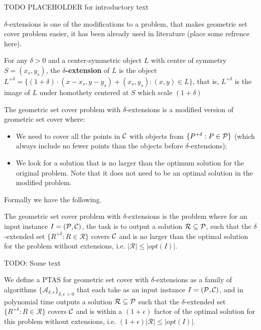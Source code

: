 TODO PLACEHOLDER for introductory text

$\delta$-extensions is one of the
modifications to a problem, that makes geometric set cover problem easier,
it has been already used in literature (place some refrence here).

\begin{defi}
For any $\delta > 0$ and a center-symmetric object $L$ with
centre of symmetry $S = (x_s, y_s)$,
the \textbf{$\delta$-extension} of $L$ is the object $L^{+\delta} =
\{(1 + \delta)\cdot(x - x_s, y - y_s) + (x_s, y_s) : (x, y) \in L\}$,
that is, $L^{+\delta}$ is the image of $L$ under homothety centered
at $S$ which scale $(1+\delta)$
\end{defi}


The geometric set cover problem with $\delta$-extensions
is a modified version of geometric set cover where:
\begin{itemize}
\item We need to cover all the points in $\mathcal{C}$
with objects from $\{P^{+\delta} : P \in \mathcal{P}\}$ (which always 
include no fewer points than the objects
before $\delta$-extensions);
\item We look for a solution that is no larger than the optimum solution
for the original problem.
Note that it does not need to be an optimal solution in
the modified problem.
\end{itemize}

Formally we have the following.

\begin{defi}
The geometric set cover problem
with $\delta$-extensions is the problem where for an input instance
$I=(\mathcal{P}, \mathcal{C})$,
the task is to output a solution $\mathcal{R} \subseteq \mathcal{P}$,
such that the $\delta$-extended set
$\{ R^{+\delta} :  R \in \mathcal{R} \}$ covers $\mathcal{C}$
and is no larger than the optimal solution for the problem without
extensions, i.e. $|\mathcal{R}| \le |opt(I)|$.
\end{defi}

TODO: Some text

\begin{defi}
We define a PTAS for geometric set cover 
with $\delta$-extensions as a family of algorithms
$\{\mathcal{A}_{\delta, \epsilon}\}_{\delta, \epsilon > 0}$ that
each take as an input instance $I=(\mathcal{P}, \mathcal{C})$,
and in polynomial time outputs a solution $\mathcal{R} \subseteq \mathcal{P}$
such that the $\delta$-extended set
$\{ R^{+\delta} :  R \in \mathcal{R} \}$ covers $\mathcal{C}$
and is within a $(1+\epsilon)$ factor of the optimal
solution for this problem without
extensions, i.e. $(1+\epsilon)|\mathcal{R}| \le |opt(I)|$.

\end{defi}
